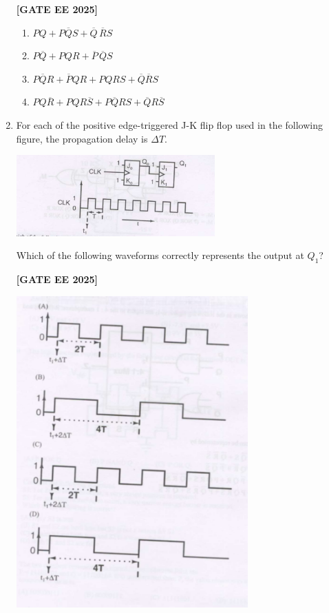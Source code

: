 \documentclass[12pt]{article}
\begin{document}
\begin{enumerate}[leftmargin=*, label=\textbf{Q.\arabic*:}]
\noindent \textbf{[GATE EE 2025]}
\begin{enumerate}[label=(\Alph*)]
  \item $PQ + P\overline{Q}S + \overline{Q}\, \overline{R}S$
  \item $P\overline{Q} + PQR + \overline{P}\, \overline{Q}S$
  \item $P\overline{Q}R + \overline{P}QR + P Q R S + \overline{Q}\overline{R}S$
  \item $P Q \overline{R} + P Q R \overline{S} + P\overline{Q}RS + \overline{Q}R\overline{S}$
\end{enumerate}

\item For each of the positive edge-triggered J-K flip flop used in the following figure, the propagation delay is $\Delta T$.

\begin{center}
\includegraphics[width=0.6\textwidth]{figs/q59a.png}
\end{center}

Which of the following waveforms correctly represents the output at $Q_1$?
 
\noindent \textbf{[GATE EE 2025]}
\begin{center}
\includegraphics[width=0.7\textwidth]{figs/q59b.png}
\end{center}


\end{enumerate}
\end{document}

